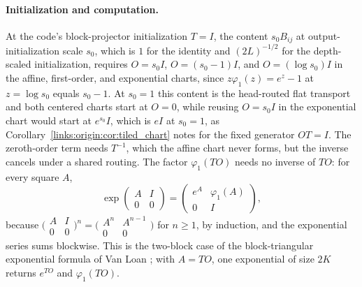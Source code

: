 \documentclass[11pt]{article}
\theoremstyle{definition}
\theoremstyle{remark}
\begin{document}
\paragraph{Initialization and computation.}
At the code's block-projector initialization $T=I$, the content $s_0B_{ij}$ at output-initialization scale $s_0$, which is $1$ for the identity and $(2L)^{-1/2}$ for the depth-scaled initialization, requires $O=s_0I$, $O=(s_0-1)I$, and $O=(\log s_0)I$ in the affine, first-order, and exponential charts, since $z\varphi_1(z)=e^z-1$ at $z=\log s_0$ equals $s_0-1$. At $s_0=1$ this content is the head-routed flat transport and both centered charts start at $O=0$, while reusing $O=s_0I$ in the exponential chart would start at $e^{s_0}I$, which is $eI$ at $s_0=1$, as Corollary~\ref{links:origin:cor:tiled_chart} notes for the fixed generator $OT=I$. The zeroth-order term needs $T^{-1}$, which the affine chart never forms, but the inverse cancels under a shared routing. The factor $\varphi_1(TO)$ needs no inverse of $TO$: for every square $A$,
\begin{equation}
\exp\begin{pmatrix}A&I\\0&0\end{pmatrix}=\begin{pmatrix}e^{A}&\varphi_1(A)\\0&I\end{pmatrix},
\label{links:origin:eq:augmented}
\end{equation}
because $\bigl(\begin{smallmatrix}A&I\\0&0\end{smallmatrix}\bigr)^n=\bigl(\begin{smallmatrix}A^n&A^{n-1}\\0&0\end{smallmatrix}\bigr)$ for $n\ge1$, by induction, and the exponential series sums blockwise. This is the two-block case of the block-triangular exponential formula of Van Loan \cite{links:vanloan1978}; with $A=TO$, one exponential of size $2K$ returns $e^{TO}$ and $\varphi_1(TO)$.
\end{document}
